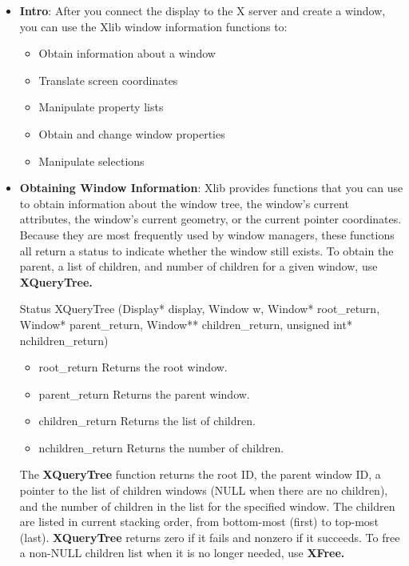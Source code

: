\documentclass{report}
\begin{document}
    \pagebreak 
    \begin{itemize}
        \item \textbf{Intro}: After you connect the display to the X server and create a window, you can use the Xlib window information functions to:
            \begin{itemize}
                \item Obtain information about a window
                \item Translate screen coordinates
                \item Manipulate property lists
                \item Obtain and change window properties
                \item Manipulate selections
            \end{itemize}
        \item \textbf{Obtaining Window Information}: Xlib provides functions that you can use to obtain information about the window tree, the window’s current attributes, the window’s current geometry, or the current pointer coordinates. Because they are most frequently used by window managers, these functions all return a status to indicate whether the window still exists.
            \bigbreak \noindent 
            To obtain the parent, a list of children, and number of children for a given window, use \textbf{XQueryTree.}
            \bigbreak \noindent 
            \begin{cppcode}
            Status XQueryTree (Display* display, Window w, Window* root_return, Window* parent_return, Window** children_return, unsigned int* nchildren_return)
            \end{cppcode}
            \begin{itemize}
                \item root\_return Returns the root window.
                \item parent\_return Returns the parent window.
                \item children\_return Returns the list of children.
                \item nchildren\_return Returns the number of children.
            \end{itemize}
            The \textbf{XQueryTree} function returns the root ID, the parent window ID, a pointer to the list of children windows (NULL when there are no children), and the number of children in the list for the specified window. The children are listed in current stacking order, from bottom-most (first) to top-most (last). \textbf{XQueryTree} returns zero if it fails and nonzero if it succeeds. To free a non-NULL children list when it is no longer needed, use \textbf{XFree.}

\end{itemize}
\end{document}
